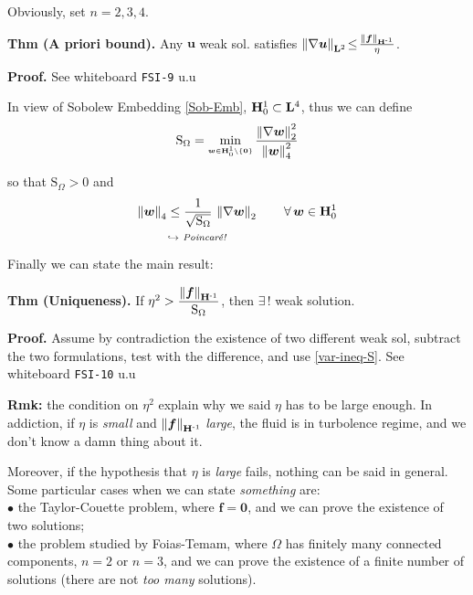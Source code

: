 
Obviously, set $n=2,3,4$.

\textbf{Thm (A priori bound).} Any $\bm u$ weak sol. satisfies $\left\lVert \nabla\bm u \right\rVert_{\mathbf{L}^2}\!\leq\! \frac{\left\lVert \bm f \right\rVert_{\mathbf{H}^{\text{-}1}}}{\eta}$.

\textbf{\color{lavender(floral)}Proof.} See whiteboard \texttt{FSI-9} u.u

\smallskip

In view of Sobolew Embedding \eqref{Sob-Emb}, $\mathbf{H}_0^1\subset\mathbf{L}^4$, thus we can define
\begin{equation*}
\mathrm{S}_{\Omega}=\min_{\scriptscriptstyle\bm w \in \mathbf{H}_0^1\setminus \{\bm 0\} } \frac{\left\lVert \nabla\bm w \right\rVert_2^2}{\left\lVert \bm w \right\rVert_4^2} 
\end{equation*} 

so that $\mathrm{S}_{\Omega}>0$ and 
\begin{equation}
\label{var-ineq-S}
\underbracket[0pt]{\norm{\bm w}_4\leq \frac{1}{\sqrt{\mathrm{S}_{\Omega}}}\, \norm{\nabla \bm w}_2}_{\hookrightarrow\textit{ Poincaré!}}\qquad \forall\,\bm w \in \Hv^1_0
\end{equation}

Finally we can state the main result:

\smallskip

\textbf{Thm (Uniqueness).} If $\eta^2>\dfrac{\left\lVert \bm f \right\rVert_{\mathbf{H}^{\text{-}1}}}{\mathrm{S}_{\Omega}}$, then $\exists\,!$ weak solution.

\smallskip

\textbf{\color{lavender(floral)}Proof.} Assume by contradiction the existence of two different weak sol, subtract the two formulations, test with the difference, and use \eqref{var-ineq-S}. See whiteboard \texttt{FSI-10} u.u

\smallskip

{\color{forestgreen(web)} \textbf{Rmk:} the condition on $\eta^2$ explain why we said $\eta$ has to be large enough. In addiction, if $\eta$ is \emph{small} and $\left\lVert \bm f \right\rVert_{\mathbf{H}^{\text{-}1}}$ \emph{large}, the fluid is in turbolence regime, and we don't know a damn thing about it.}

\smallskip

Moreover, if the hypothesis that $\eta$ is \emph{large} fails, nothing can be said in general. Some particular cases when we can state \emph{something} are: \\
$\bullet$ the Taylor-Couette problem, where $\bm f=\bm 0$, and we can prove the existence of two solutions; \\
$\bullet$ the problem studied by Foias-Temam, where $\Omega$ has finitely many connected components, $n=2$ or $n=3$, and we can prove the existence of a finite number of solutions (there are not \emph{too many} solutions).

